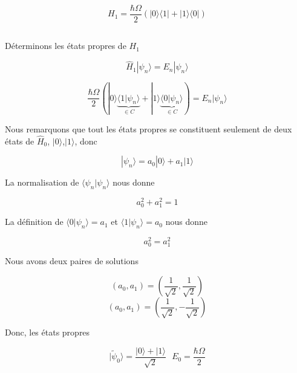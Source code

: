 \documentclass[a4paper,12pt]{article}
\begin{document}
\begin{equation}\label{key}
	H_1 = \frac{\hbar\Omega}{2}(|0\rangle\langle 1|+ |1\rangle\langle 0|)
\end{equation}

\subsection{}

Déterminons les états propres de $H_1$ 

\begin{equation}\label{key}
	\hat H_1|\psi_n\rangle = E_n|\psi_n\rangle
\end{equation}

\begin{equation}
	\frac{\hbar\Omega}{2}(|0\rangle\underbrace{\langle 1|\psi_n\rangle}_{\in C}+ |1\rangle\underbrace{\langle 0|\psi_n\rangle}_{\in C}) = E_n|\psi_n\rangle
\end{equation}

Nous remarquons que tout les états propres se constituent seulement de deux états de $\hat H_0$, $|0\rangle$,$ |1\rangle$, donc 

\begin{equation}\label{key}
	|\psi_n\rangle = a_0 |0\rangle + a_1 |1\rangle
\end{equation}

La normalisation de $\langle\psi_n|\psi_n\rangle$ nous donne 

\begin{equation}\label{key}
	a_0^2 + a_1^2 = 1
\end{equation}

La définition de $\langle 0|\psi_n\rangle = a_1$ et  $\langle 1|\psi_n\rangle = a_0$ nous donne 

\begin{equation}\label{key}
	a_0^2 = a_1^2
\end{equation}

Nous avons deux paires de solutions

\begin{equation}\label{key}
	(a_0, a_1) = (\frac{1}{\sqrt2}, \frac{1}{\sqrt2})
\end{equation}
\begin{equation}\label{key}
	(a_0, a_1) = (\frac{1}{\sqrt2}, -\frac{1}{\sqrt2})
\end{equation}

Donc, les états propres 

\begin{equation}\label{key}
	|\tilde \psi_0\rangle = \frac{|0\rangle + |1\rangle}{\sqrt2}\ \ \ E_0 = \frac{\hbar\Omega}{2}
\end{equation}
\end{document}
